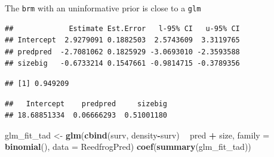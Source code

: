\documentclass[
  ignorenonframetext,
]{beamer}
\newenvironment{Shaded}{\begin{snugshade}}{\end{snugshade}}
\newcommand{\DataTypeTok}[1]{\textcolor[rgb]{0.13,0.29,0.53}{#1}}
\newcommand{\DecValTok}[1]{\textcolor[rgb]{0.00,0.00,0.81}{#1}}
\newcommand{\KeywordTok}[1]{\textcolor[rgb]{0.13,0.29,0.53}{\textbf{#1}}}
\newcommand{\NormalTok}[1]{#1}
\newcommand{\OperatorTok}[1]{\textcolor[rgb]{0.81,0.36,0.00}{\textbf{#1}}}
\newcommand{\StringTok}[1]{\textcolor[rgb]{0.31,0.60,0.02}{#1}}
\begin{document}
\begin{frame}[fragile]{The \texttt{brm} with an uninformative prior is
close to a \texttt{glm}}
\protect\hypertarget{the-brm-with-an-uninformative-prior-is-close-to-a-glm}{}

\scriptsize

\begin{Shaded}
\end{Shaded}

\begin{verbatim}
##             Estimate Est.Error   l-95% CI   u-95% CI
## Intercept  2.9279091 0.1882503  2.5743609  3.3119765
## predpred  -2.7081062 0.1825929 -3.0693010 -2.3593588
## sizebig   -0.6733214 0.1547661 -0.9814715 -0.3789356
\end{verbatim}

\begin{Shaded}
\end{Shaded}

\begin{verbatim}
## [1] 0.949209
\end{verbatim}

\begin{Shaded}
\end{Shaded}

\begin{verbatim}
##   Intercept    predpred     sizebig 
## 18.68851334  0.06666293  0.51001180
\end{verbatim}

\begin{Shaded}
\begin{Highlighting}[]
\NormalTok{glm_fit_tad <-}\StringTok{ }\KeywordTok{glm}\NormalTok{(}\KeywordTok{cbind}\NormalTok{(surv, density}\OperatorTok{-}\NormalTok{surv) }\OperatorTok{~}\StringTok{ }\NormalTok{pred }\OperatorTok{+}\StringTok{ }\NormalTok{size, }
                   \DataTypeTok{family =} \KeywordTok{binomial}\NormalTok{(), }\DataTypeTok{data =}\NormalTok{ ReedfrogPred)}
\KeywordTok{coef}\NormalTok{(}\KeywordTok{summary}\NormalTok{(glm_fit_tad))}
\end{Highlighting}
\end{Shaded}


\end{frame}
\end{document}
